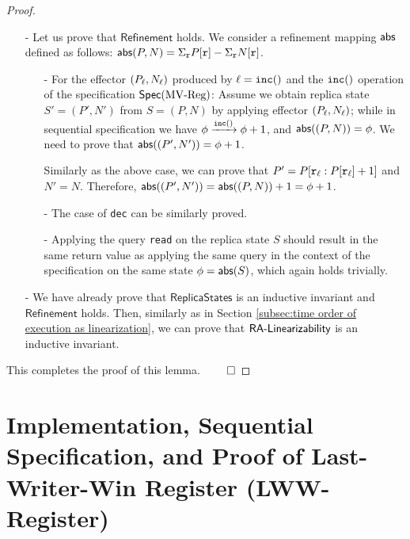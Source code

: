 \begin {proof}
\begin{itemize}
\item[-] Let us prove that $\mathsf{Refinement}$ holds. We consider a refinement mapping $\refmap$ defined as follows: $\refmap(P,N) = \Sigma_{\arep} P[\arep] - \Sigma_{\arep} N[\arep]$.

    \begin{itemize}
    \setlength{\itemsep}{0.5pt}
    \item[-] For the effector $(P_{\alabel},N_{\alabel})$ produced by $\alabel = \alabelshort[{\tt inc}]{}$ and the $\alabelshort[{\tt inc}]{}$ operation of the specification $\specMVReg$: Assume we obtain replica state $S'=(P',N')$ from $S=(P,N)$ by applying effector $(P_{\alabel},N_{\alabel})$; while in sequential specification we have $\abstate \xrightarrow{\alabelshort[{\tt inc}]{}} \abstate+1$, and $\refmap((P,N)) = \abstate$. We need to prove that $\refmap((P',N')) = \abstate+1$.

        Similarly as the above case, we can prove that $P' = P[\arep_{\alabel}: P[\arep_{\alabel}]+1]$ and $N' = N$. Therefore, $\refmap((P',N')) = \refmap((P,N))+1 = \abstate+1$.

    \item[-] The case of {\tt dec} can be similarly proved.

    \item[-] Applying the query {\tt read} on the replica state $S$ should result in the same return value as applying the same query in the context of the specification on the same state $\abstate = \refmap(S)$, which again holds trivially.
    \end{itemize}

\item[-] We have already prove that $\mathsf{ReplicaStates}$ is an inductive invariant and $\mathsf{Refinement}$ holds. Then, similarly as in Section \ref{subsec:time order of execution as linearization}, we can prove that $\mathsf{\CRDTLinshort{}}$ is an inductive invariant.
\end{itemize}

This completes the proof of this lemma. $\qed$
\end {proof}








\section{Implementation, Sequential Specification, and Proof of Last-Writer-Win Register (LWW-Register)}
\label{sec:implementation, sequential specification, and proof of last-writer-win register (LWW-register)}



